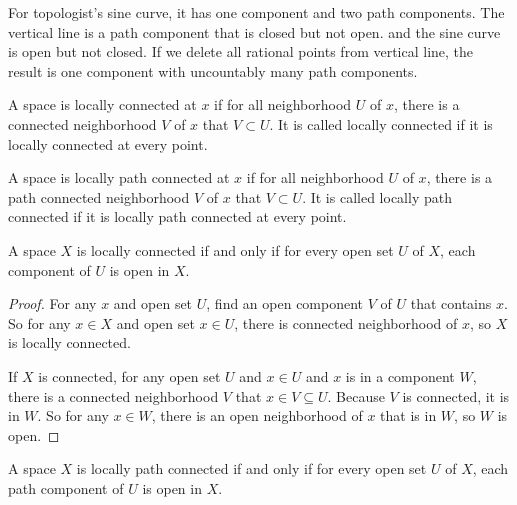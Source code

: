 \begin{example}
    For topologist's sine curve, it has one component and two path components. The vertical line is a path component that is closed but not open. and the sine curve is open but not closed. If we delete all rational points from vertical line, the result is one component with uncountably many path components.    
\end{example}



\begin{definition}
    A space is locally connected at $x$ if for all neighborhood $U$ of $x$, there is a connected neighborhood $V$ of $x$ that $V \subset U$. It is called locally connected if it is locally connected at every point.
\end{definition}

\begin{definition}
    A space is locally path connected at $x$ if for all neighborhood $U$ of $x$, there is a path connected neighborhood $V$ of $x$ that $V \subset U$. It is called locally path connected if it is locally path connected at every point.
\end{definition}

\begin{theorem}
A space $X$ is locally connected if and only if for every open set $U$ of $X$, each component of $U$ is open in $X$.    
\end{theorem}
\begin{proof}
    For any $x$ and open set $U$, find an open component $V$ of $U$ that contains $x$. So for any $x \in X$ and open set $x \in U$, there is connected neighborhood of $x$, so $X$ is locally connected.
    
    If $X$ is connected, for any open set $U$ and $x \in U$ and $x$ is in a component $W$, there is a connected neighborhood $V$ that $x \in V \subseteq U$. Because $V$ is connected, it is in $W$. So for any $x \in W$, there is an open neighborhood of $x$ that is in $W$, so $W$ is open.
\end{proof}

\begin{theorem}
A space $X$ is locally path connected if and only if for every open set $U$ of $X$, each path component of $U$ is open in $X$.    
\end{theorem}

